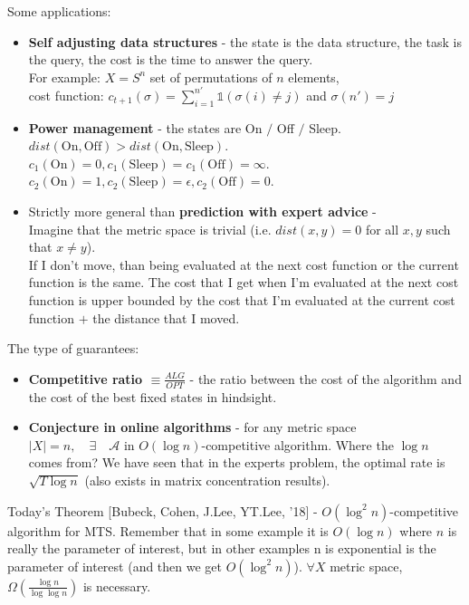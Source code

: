 \documentclass[11pt]{book} %
\begin{document}
Some applications:
\begin{itemize}
    \item \textbf{Self adjusting data structures} - the state is the data structure, the task is the query, the cost is the time to answer the query. \\
    For example: $X = S^n$ set of permutations of $n$ elements, \\
    cost function: $c_{t+1}(\sigma) = \sum_{i=1}^{n'} \mathds{1} (\sigma(i) \neq j)$ and $\sigma(n') = j$ 

    \item \textbf{Power management} - the states are On $/$ Off $/$ Sleep. \\
            $dist(\text{On}, \text{Off}) > dist(\text{On}, \text{Sleep})$. \\
            $c_1(\text{On}) = 0, c_1(\text{Sleep}) = c_1(\text{Off}) = \infty$. \\
            $c_2(\text{On}) = 1, c_2(\text{Sleep}) = \epsilon, c_2(\text{Off}) = 0$. 

    \item Strictly more general than \textbf{prediction with expert advice} - \\
        Imagine that the metric space is trivial (i.e. $dist(x, y) = 0$ for all $x, y$ such that $x \neq y$). \\
        If I don't move, than being evaluated at the next cost function or the current function is the same. 
        The cost that I get when I'm evaluated at the next cost function is upper bounded by the cost that I'm evaluated at the current cost function 
        $+$ the distance that I moved.
\end{itemize}


The type of guarantees:
\begin{itemize}
    \item \textbf{Competitive ratio $\equiv \frac{ALG}{OPT}$} - the ratio between the cost of the algorithm and the cost of the best fixed states in hindsight. 
    \item \textbf{Conjecture in online algorithms} - for any metric space $|X| = n, \quad \exists \quad \mathcal{A} \text{ in } O(\log n)$-competitive algorithm.
        Where the $\log n$ comes from? We have seen that in the experts problem, the optimal rate is $\sqrt{T \log n}$ (also exists in matrix concentration results).
\end{itemize}

Today's Theorem [Bubeck, Cohen, J.Lee, YT.Lee, '18] - $O(\log^2 n)$-competitive algorithm for MTS.
Remember that in some example it is $O(\log n)$ where $n$ is really the parameter of interest, 
but in other examples n is exponential is the parameter of interest (and then we get $O(\log^2 n)$).
$\forall X$ metric space, $\Omega(\frac{\log n}{\log \log n})$ is necessary.
\end{document}
